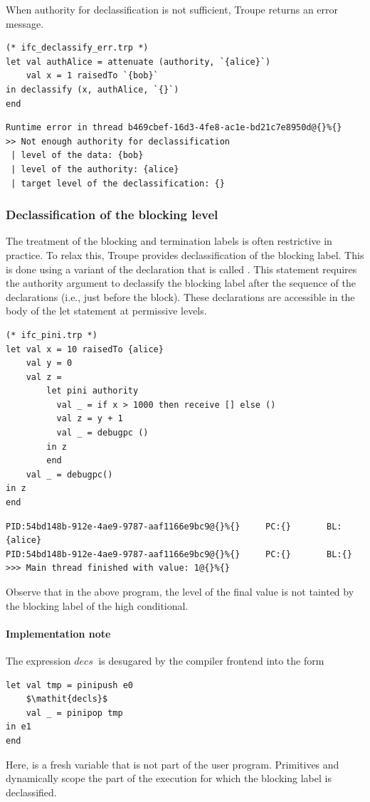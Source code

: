 When authority for declassification is not sufficient, Troupe returns an error message.
\begin{lstlisting}
(* ifc_declassify_err.trp *)
let val authAlice = attenuate (authority, `{alice}`)
    val x = 1 raisedTo `{bob}`
in declassify (x, authAlice, `{}`)
end
\end{lstlisting}

\begin{lstlisting}
Runtime error in thread b469cbef-16d3-4fe8-ac1e-bd21c7e8950d@{}%{}
>> Not enough authority for declassification
 | level of the data: {bob}
 | level of the authority: {alice}
 | target level of the declassification: {}
\end{lstlisting}


\subsubsection{Declassification of the blocking level}
\label{sec:pinidecl}
The treatment of the blocking and termination labels is often restrictive in practice. To relax this,
Troupe provides declassification of the blocking label. This is done using
a variant of the  declaration that is called .
This statement requires the authority argument to declassify the blocking label
after the sequence of the declarations (i.e., just before the  block).
These declarations are accessible in the body of the let statement at permissive
levels.

\begin{lstlisting}
(* ifc_pini.trp *)
let val x = 10 raisedTo {alice}
    val y = 0
    val z =
        let pini authority
          val _ = if x > 1000 then receive [] else ()
          val z = y + 1
          val _ = debugpc ()
        in z
        end
    val _ = debugpc()
in z
end
\end{lstlisting}

\begin{verbatim}
PID:54bd148b-912e-4ae9-9787-aaf1166e9bc9@{}%{}     PC:{}       BL:{alice}
PID:54bd148b-912e-4ae9-9787-aaf1166e9bc9@{}%{}     PC:{}       BL:{}
>>> Main thread finished with value: 1@{}%{}
\end{verbatim}
Observe that in the above program, the level of the final value 
is not tainted by the blocking label of the high conditional.


\paragraph{Implementation note}
The expression  $\mathit{decs}\ $ is desugared by the compiler frontend into the form
\begin{lstlisting}
let val tmp = pinipush e0
    $\mathit{decls}$
    val _ = pinipop tmp
in e1
end
\end{lstlisting}
Here,  is a fresh variable that is not part of the user program. Primitives  and
 dynamically scope the part of the execution for which the blocking label is declassified.


